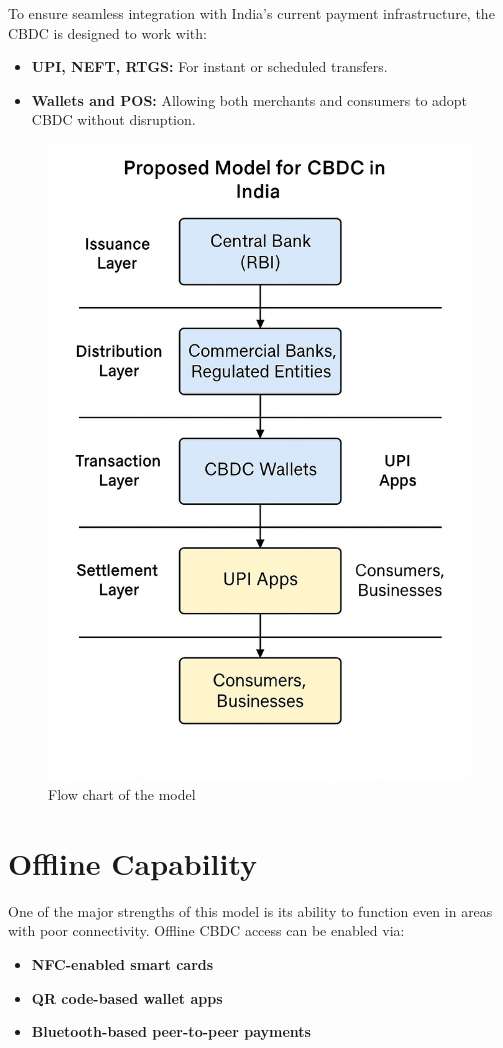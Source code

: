 To ensure seamless integration with India’s current payment infrastructure, the CBDC is designed to work with:

\begin{itemize}
    \item \textbf{UPI, NEFT, RTGS:} For instant or scheduled transfers.
    \item \textbf{Wallets and POS:} Allowing both merchants and consumers to adopt CBDC without disruption.
\end{itemize}

\begin{figure}
    \centering
    \includegraphics[width=0.75\linewidth]{image3.png}
    \caption{Flow chart of the model}
    \label{fig:enter-label}
\end{figure}
\section{Offline Capability}

One of the major strengths of this model is its ability to function even in areas with poor connectivity. Offline CBDC access can be enabled via:

\begin{itemize}
    \item \textbf{NFC-enabled smart cards}
    \item \textbf{QR code-based wallet apps}
    \item \textbf{Bluetooth-based peer-to-peer payments}
\end{itemize}

